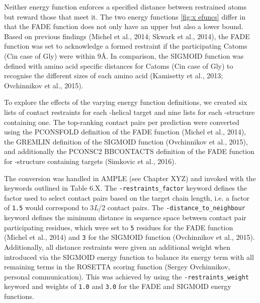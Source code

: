 Neither energy function enforces a specified distance between restrained atoms but reward those that meet it. The two energy functions \ref{fig:x efuncs} differ in that the FADE function does not only have an upper but also a lower bound. Based on previous findings (Michel et al., 2014; Skwark et al., 2014), the FADE function was set to acknowledge a formed restraint if the participating C\textbeta atoms (C\textalpha in case of Gly) were within 9\AA. In comparison, the SIGMOID function was defined with amino acid specific distances for C\textbeta atoms (C\textalpha in case of Gly) to recognise the different sizes of each amino acid (Kamisetty et al., 2013; Ovchinnikov et al., 2015).


To explore the effects of the varying energy function definitions, we created six lists of contact restraints for each \textalpha-helical target and nine lists for each \textbeta-structure containing one. The top-ranking contact pairs per prediction were converted using the PCONSFOLD definition of the FADE function (Michel et al., 2014), the GREMLIN definition of the SIGMOID function (Ovchinnikov et al., 2015), and additionally the PCONSC2 BBCONTACTS definition of the FADE function for \textbeta-structure containing targets (Simkovic et al., 2016).

The conversion was handled in AMPLE (see Chapter XYZ) and invoked with the keywords outlined in Table 6.X. The \texttt{-restraints\_factor} keyword defines the factor used to select contact pairs based on the target chain length, i.e. a factor of \texttt{1.5} would correspond to 3\textit{L}/2 contact pairs. The \texttt{-distance\_to\_neighbour} keyword defines the minimum distance in sequence space between contact pair participating residues, which were set to \texttt{5} residues for the FADE function (Michel et al., 2014) and \texttt{3} for the SIGMOID function (Ovchinnikov et al., 2015). Additionally, all distance restraints were given an additional weight when introduced via the SIGMOID energy function to balance its energy term with all remaining terms in the ROSETTA scoring function (Sergey Ovchinnikov, personal communication). This was achieved by using the \texttt{-restraints\_weight} keyword and weights of \texttt{1.0} and \texttt{3.0} for the FADE and SIGMOID energy functions.

